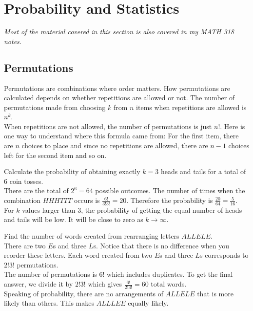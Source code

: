 \section{Probability and Statistics}

\textit{Most of the material covered in this section is also covered in my MATH 318 notes.}

\subsection{Permutations}

Permutations are combinations where order matters. How permutations are calculated depends on whether repetitions are allowed or not. The number of permutations made from choosing $k$ from $n$ items when repetitions are allowed is $n^k$. \\

When repetitions are not allowed, the number of permutations is just $n!$. Here is one way to understand where this formula came from: For the first item, there are $n$ choices to place and since no repetitions are allowed, there are $n-1$ choices left for the second item and so on.

\begin{texample}
	Calculate the probability of obtaining exactly $k=3$ heads and tails for a total of 6 coin tosses. \\
	
	There are the total of $2^6=64$ possible outcomes. The number of times when the combination $HHHTTT$ occurs is $\frac{6!}{3!3!}=20$. Therefore the probability is $\frac{20}{64}=\frac{5}{16}$. \\
	
	For $k$ values larger than $3$, the probability of getting the equal number of heads and tails will be low. It will be close to zero as $k \to \infty$.
\end{texample}

\begin{texample}
	Find the number of words created from rearranging letters $ALLELE$. \\
	
	There are two $E$s and three $L$s. Notice that there is no difference when you reorder these letters. Each word created from two $E$s and three $L$s corresponds to $2!3!$ permutations. \\
	
	The number of permutations is $6!$ which includes duplicates. To get the final answer, we divide it by $2!3!$ which gives $\frac{6!}{2!3!}=60$ total words. \\
	
	Speaking of probability, there are no arrangements of $ALLELE$ that is more likely than others. This makes $ALLLEE$ equally likely.
\end{texample}

